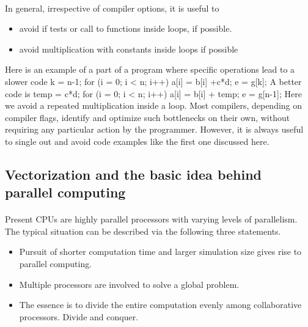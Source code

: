 \documentclass[%
oneside,                 %
final,                   %
10pt]{article}
\begin{document}
\paragraph{}
In general, irrespective of compiler options, it is useful to
\begin{itemize}
\item avoid if tests or call to functions inside loops, if possible. 

\item avoid multiplication with constants inside loops if possible
\end{itemize}

\noindent
Here is an example of a part of a program where specific operations lead to a slower code
\bcppcod
k = n-1;
for (i = 0; i < n; i++){
    a[i] = b[i] +c*d;
    e = g[k];
}
\ecppcod
A better code is
\bcppcod
temp = c*d;
for (i = 0; i < n; i++){
    a[i] = b[i] + temp;
}
e = g[n-1];
\ecppcod
Here we avoid a repeated multiplication inside a loop. 
Most compilers, depending on compiler flags, identify and optimize such bottlenecks on their own, without requiring any particular action by the programmer. However, it is always useful to single out and avoid code examples like the first one discussed here.



\subsection{Vectorization and the basic idea behind parallel computing}

\paragraph{}
Present CPUs are highly parallel processors with varying levels of parallelism. The typical situation can be described via the following three statements.
\begin{itemize}
\item Pursuit of shorter computation time and larger simulation size gives rise to parallel computing.

\item Multiple processors are involved to solve a global problem.

\item The essence is to divide the entire computation evenly among collaborative processors.  Divide and conquer.
\end{itemize}
\end{document}
